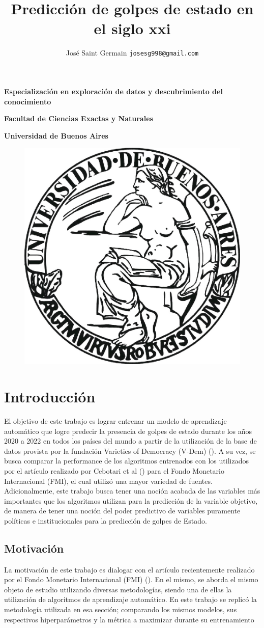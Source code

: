 \documentclass{article}
\title{Predicción de golpes de estado en el siglo xxi}
\author{José Saint Germain \texttt{josesg998@gmail.com} }
\begin{document}
\maketitle

\textbf{\Large Especialización en exploración de datos y descubrimiento del conocimiento}

\textbf{\Large Facultad de Ciencias Exactas y Naturales}

\textbf{\Large Universidad de Buenos Aires}

\begin{figure}[H]
  \centering  
  \includegraphics[width=.5\textwidth]{0_portada.jpg}
\end{figure}

\pagebreak
\tableofcontents
\pagebreak

\section{Introducción}
El objetivo de este trabajo es lograr entrenar un modelo de aprendizaje automático
que logre predecir la presencia de golpes de estado durante los años 
2020 a 2022 en todos los países del mundo a partir de la utilización de la base de datos 
provista por la fundación Varieties of Democracy (V-Dem) (\cite{Cop24}). A su vez, se 
busca comparar la performance de los algoritmos entrenados con los utilizados por el artículo
realizado por Cebotari et al (\cite{Ceb24}) para el Fondo Monetario Internacional (FMI), el 
cual utilizó una mayor variedad de fuentes. 
Adicionalmente, este trabajo busca tener una noción acabada de las variables más importantes 
que los algoritmos utilizan para la predicción de la variable objetivo, de manera de tener
una noción del poder predictivo de variables puramente políticas e institucionales para 
la predicción de golpes de Estado.

\subsection{Motivación}
La motivación de este trabajo es dialogar con el artículo recientemente realizado por el 
Fondo Monetario Internacional (FMI) (\cite{Ceb24}). En el mismo, se aborda el mismo objeto 
de estudio utilizando diversas metodologías, siendo una de ellas la utilización de 
algoritmos de aprendizaje automático. En este trabajo se replicó la metodología utilizada 
en esa sección; comparando los mismos modelos, sus respectivos hiperparámetros y la 
métrica a maximizar durante su entrenamiento
\end{document}
